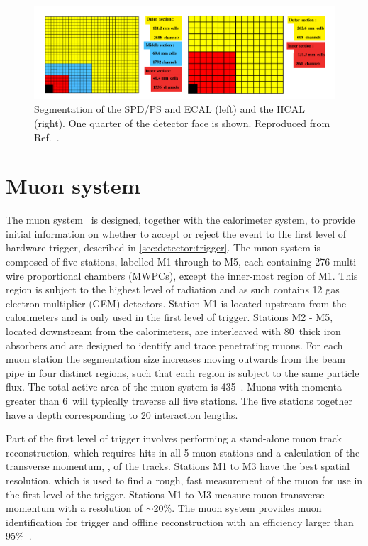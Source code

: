 \begin{figure}
\includegraphics[width=\linewidth]{figures/detector/calorimeters.pdf}
\caption{Segmentation of the SPD/PS and ECAL (left) and the HCAL (right). One quarter of the detector face is shown. Reproduced from Ref.~\cite{lhcbdetector2008}.}
\label{calorimeter}
\end{figure}

\section{Muon system}
\label{sec:detector:muon}

The muon system~\cite{LHCb-DP-2013-001,LHCb-DP-2012-002} is designed, together with the calorimeter system, to provide initial information on whether to accept or reject the event to the first level of hardware trigger, described in \sect\ref{sec:detector:trigger}. The muon system is composed of five stations, labelled M1 through to M5, each containing 276 multi-wire proportional chambers (MWPCs), except the inner-most region of M1. This region is subject to the highest level of radiation and as such contains 12 gas electron multiplier (GEM) detectors. Station M1 is located upstream from the calorimeters and is only used in the first level of trigger. Stations M2 - M5, located downstream from the calorimeters, are interleaved with 80~\cm thick iron absorbers and are designed to identify and trace penetrating muons. For each muon station the segmentation size increases moving outwards from the beam pipe in four distinct regions, such that each region is subject to the same particle flux. The total active area of the muon system is 435~\ma. Muons with momenta greater than 6~\gevc will typically traverse all five stations. The five stations together have a depth corresponding to 20 interaction lengths. 

Part of the first level of trigger involves performing a stand-alone muon track reconstruction, which requires hits in all 5 muon stations and a calculation of the transverse momentum, \pt, of the tracks. Stations M1 to M3 have the best spatial resolution, which is used to find a rough, fast measurement of the muon \pt for use in the first level of the trigger. Stations M1 to M3 measure muon transverse momentum with a resolution of $\sim$20\%. The muon system provides muon identification for trigger and offline reconstruction with an efficiency larger than 95\%~\cite{LHCb-DP-2014-002}.

